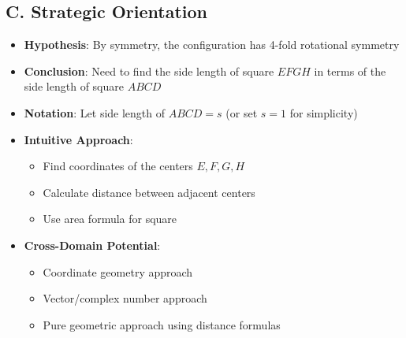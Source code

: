 \documentclass[]{article}
\begin{document}
\begin{problemconfigbox}
\subsection*{C. Strategic Orientation}
\begin{itemize}[leftmargin=*]
    \item \textbf{Hypothesis}: By symmetry, the configuration has 4-fold rotational symmetry
    \item \textbf{Conclusion}: Need to find the side length of square $EFGH$ in terms of the side length of square $ABCD$
    \item \textbf{Notation}: Let side length of $ABCD = s$ (or set $s=1$ for simplicity)
    \item \textbf{Intuitive Approach}: 
    \begin{itemize}
        \item Find coordinates of the centers $E, F, G, H$
        \item Calculate distance between adjacent centers
        \item Use area formula for square
    \end{itemize}
    \item \textbf{Cross-Domain Potential}: 
    \begin{itemize}
        \item Coordinate geometry approach
        \item Vector/complex number approach
        \item Pure geometric approach using distance formulas
    \end{itemize}
\end{itemize}
\end{problemconfigbox}
\end{document}
